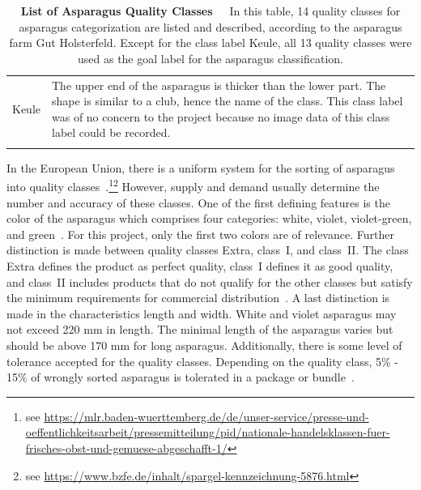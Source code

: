 \begin{table}[!ht]
{\begin{tabular}{l p{14cm}}
		\smallskip
		Keule & The upper end of the asparagus is thicker than the lower part. The shape                 is similar to a club, hence the name of the class. This class label was of no concern         to the project because no image data of this class label could be recorded. \\
		\\
		\hline
	\end{tabular}%
	}
	\caption[List of Asparagus Quality Classes]{\textbf{List of Asparagus Quality Classes}~~~In this table, 14 quality classes for asparagus categorization are listed and described, according to the asparagus farm Gut Holsterfeld. Except for the class label Keule, all 13 quality classes were used as the goal label for the asparagus classification.}
	\label{tab:AsparagusLabels}
\end{table}

In the European Union, there is a uniform system for the sorting of asparagus into quality classes~\citep{euspargelnorm,unspargelnorm}.\footnote{see \url{https://mlr.baden-wuerttemberg.de/de/unser-service/presse-und-oeffentlichkeitsarbeit/pressemitteilung/pid/nationale-handelsklassen-fuer-frisches-obst-und-gemuese-abgeschafft-1/}}\footnote{see \url{https://www.bzfe.de/inhalt/spargel-kennzeichnung-5876.html}} However, supply and demand usually determine the number and accuracy of these classes. One of the first defining features is the color of the asparagus which comprises four categories: white, violet, violet-green, and green~\citep{euspargelnorm}. For this project, only the first two colors are of relevance. Further distinction is made between quality classes Extra, class~I, and class~II. The class Extra defines the product as perfect quality, class~I defines it as good quality, and class~II includes products that do not qualify for the other classes but satisfy the minimum requirements for commercial distribution~\citep{euspargelnorm}. A last distinction is made in the characteristics length and width. White and violet asparagus may not exceed 220 mm in length. The minimal length of the asparagus varies but should be above 170 mm for long asparagus. Additionally, there is some level of tolerance accepted for the quality classes. Depending on the quality class, 5\% - 15\% of wrongly sorted asparagus is tolerated in a package or bundle~\citep{euspargelnorm}.


